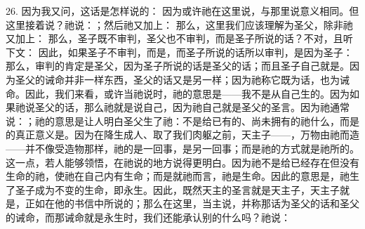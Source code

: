26. 因为我又问，这话是怎样说的： 因为或许祂在这里说，与那里说意义相同。但这里接着说？祂说：；然后祂又加上： 那么，这里我们应该理解为圣父，除非祂又加上： 那么，圣子既不审判，圣父也不审判，而是圣子所说的话？不对，且听下文： 因此，如果圣子不审判，而是，而圣子所说的话所以审判，是因为圣子：那么，审判的肯定是圣父，因为圣子所说的话是圣父的话；而且圣子自己就是。因为圣父的诫命并非一样东西，圣父的话又是另一样；因为祂称它既为话，也为诫命。因此，我们来看，或许当祂说时，祂的意思是——我不是从自己生的。因为如果祂说圣父的话，那么祂就是说自己，因为祂自己就是圣父的圣言。因为祂通常说：；祂的意思是让人明白圣父生了祂：不是给已有的、尚未拥有的祂什么，而是的真正意义是。因为在降生成人、取了我们肉躯之前，天主子——，万物由祂而造——并不像受造物那样，祂的是一回事，是另一回事；而是祂的方式就是祂所的。这一点，若人能够领悟，在祂说的地方说得更明白。因为祂不是给已经存在但没有生命的祂，使祂在自己内有生命；而是就祂而言，祂是生命。因此的意思是，祂生了圣子成为不变的生命，即永生。因此，既然天主的圣言就是天主子，天主子就是，正如在他的书信中所说的；那么在这里，当主说，并称那话为圣父的话和圣父的诫命，而那诫命就是永生时，我们还能承认别的什么吗？祂说：\par

